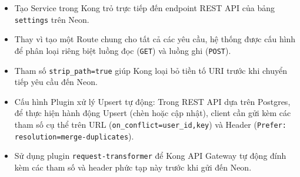 \begin{itemize}

\item Tạo Service trong Kong trỏ trực tiếp đến endpoint REST API của bảng \texttt{settings} trên Neon.
\item Thay vì tạo một Route chung cho tất cả các yêu cầu,
hệ thống được cấu hình để phân loại riêng biệt luồng đọc (\texttt{GET}) và luồng ghi (\texttt{POST}).
\item Tham số \texttt{strip\_path=true} giúp Kong loại bỏ tiền tố URI trước khi chuyển tiếp yêu cầu đến Neon.
\item Cấu hình Plugin xử lý Upsert tự động:
Trong REST API dựa trên Postgres,
để thực hiện hành động Upsert
(chèn hoặc cập nhật),
client cần gửi kèm các tham số cụ thể trên URL
(\texttt{on\_conflict=user\_id,key})
và Header (\texttt{Prefer: resolution=merge-duplicates}).
\item Sử dụng plugin \texttt{request-transformer}
để Kong API Gateway
tự động đính kèm các tham số
và header phức tạp này trước khi gửi đến Neon.

\end{itemize}
